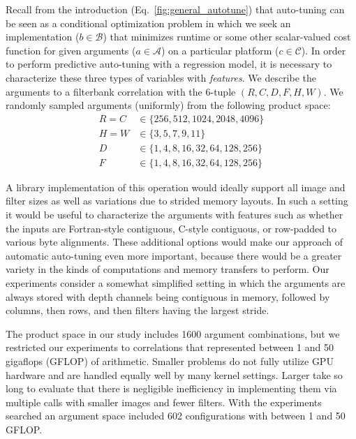 \documentclass{sig-alternate}
\begin{document}
Recall from the introduction (Eq.~\ref{fig:general_autotune}) that auto-tuning can be seen
as a conditional optimization problem in which we seek an implementation ($b \in \mathcal{B}$) that minimizes runtime or some other scalar-valued cost function
for given arguments ($a \in \mathcal{A}$) on a particular platform ($c \in \mathcal{C}$).
In order to perform predictive auto-tuning with a regression model,
it is necessary to characterize these
three types of variables with {\em features}.
We describe the arguments to a filterbank correlation with the 6-tuple
$(R, C, D, F, H, W)$.
We randomly sampled arguments (uniformly) from the following product space:
\begin{align*}
R = C & \in \{ 256, 512, 1024, 2048, 4096 \} \\
H = W & \in \{ 3, 5, 7, 9, 11 \} \\
D &  \in \{1, 4, 8, 16, 32, 64, 128, 256 \} \\
F &  \in \{1, 4, 8, 16, 32, 64, 128, 256 \}
\end{align*}

A library implementation of this operation would ideally support all image and
filter sizes as well as variations due
to strided memory layouts. In such a setting it would be useful to characterize
the arguments with
features such as whether the inputs are Fortran-style contiguous, C-style contiguous, or row-padded to various byte alignments.
These additional options would make our
approach of automatic auto-tuning even more important, because there would be
a greater variety in the kinds of computations and memory transfers to
perform.
Our experiments consider a somewhat simplified setting in which the arguments are always stored
with depth channels being contiguous in memory, followed by columns, then rows, and then filters having the largest stride.

The product space in our study
includes 1600 argument combinations, but we restricted our experiments to correlations that
represented between 1 and 50 gigaflops (GFLOP) of arithmetic.
Smaller problems do not fully utilize GPU hardware and are handled equally well by many kernel settings.
Larger take so long to evaluate that there is negligible
inefficiency in implementing them via multiple calls with smaller images and fewer filters.
With the experiments searched an argument space included 602 configurations with between 1 and 50 GFLOP.
\end{document}
